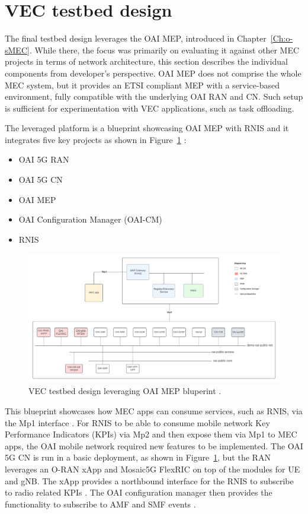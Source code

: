 \documentclass[12pt,a4paper,twoside]{report}
\begin{document}
\section{VEC testbed design}
The final testbed design leverages the OAI MEP, introduced in Chapter~\ref{Ch:o-sMEC}. While there, the focus was primarily on evaluating it against other MEC projects in terms of network architecture, this section describes the individual components from developer’s perspective. OAI MEP does not comprise the whole MEC system, but it provides an ETSI compliant MEP with a service-based environment, fully compatible with the underlying OAI RAN and CN. Such setup is sufficient for experimentation with VEC applications, such as task offloading.

The leveraged platform is a blueprint showcasing OAI MEP with RNIS and it integrates five key projects as shown in Figure~\ref{F:VEC-tstbed-arch} \cite{oai-blueprint-git}:
%
\begin{itemize}[itemsep=2pt]
	\item OAI 5G RAN
	\item OAI 5G CN
	\item OAI MEP
	\item OAI Configuration Manager (OAI-CM)
	\item RNIS
\end{itemize}
%
\begin{figure}[ht]
	\centering
	\begin{sideways}
		\includegraphics[width=20cm]{./images/OAI-MEP-parts.png} 	
	\end{sideways}
	\caption{VEC testbed design leveraging OAI MEP bluperint \cite{oai-blueprint-git}.}
	\label{F:VEC-tstbed-arch}
\end{figure}
%
\FloatBarrier
This blueprint showcases how MEC apps can consume services, such as RNIS, via the Mp1 interface \cite{oai-blueprint-git}. For RNIS to be able to consume mobile network Key Performance Indicators (KPIs) via Mp2 and then expose them via Mp1 to MEC apps, the OAI mobile network required new features to be implemented. The OAI 5G CN is run in a basic deployment, as shown in Figure~\ref{F:VEC-tstbed-arch}, but the RAN leverages an O-RAN xApp and Mosaic5G FlexRIC on top of the modules for UE and gNB. The xApp provides a northbound interface for the RNIS to subscribe to radio related KPIs \cite{oai-rnis-git}. The OAI configuration manager then provides the functionality to subscribe to AMF and SMF events \cite{oai-cm-git}.
\end{document}
